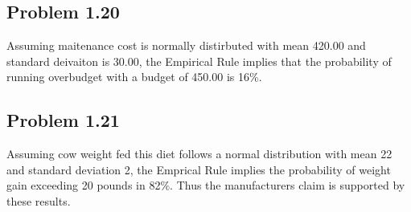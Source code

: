 \documentclass[12pt]{article}
\begin{document}
\subsection*{Problem 1.20}
    Assuming maitenance cost is normally distirbuted with mean 420.00 and standard deivaiton is 30.00, the Empirical Rule implies that the probability of running overbudget with a budget of 450.00 is 16\%. 
    
\subsection*{Problem 1.21}
    Assuming cow weight fed this diet follows a normal distribution with mean 22 and standard deviation 2, the Emprical Rule implies the probability of weight gain exceeding 20 pounds in 82\%.
    Thus the manufacturers claim is supported by these results.
\end{document}
